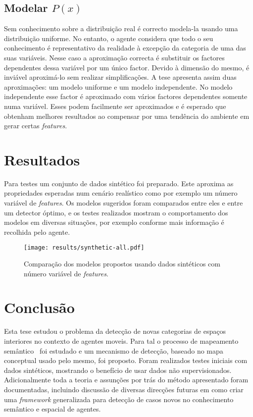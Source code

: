 \documentclass[9pt,a4paper]{extarticle}
\begin{document}
\begin{multicols}{2}
\subsection{Modelar $P(x)$}
Sem conhecimento sobre a distribuição real é correcto modela-la usando uma distribuição
uniforme. No entanto, o agente considera que todo o seu conhecimento é representativo
da realidade à excepção da categoria de uma das suas variáveis. Nesse caso a aproximação correcta é substituir
os factores dependentes dessa variável por um único factor.
Devido à dimensão do mesmo, é inviável aproximá-lo sem realizar simplificações.
A tese apresenta assim duas aproximações: um modelo uniforme e um modelo independente. No modelo independente
esse factor é aproximado com vários factores dependentes somente numa variável. Esses podem facilmente ser
aproximados e é esperado que obtenham melhores resultados ao compensar por uma tendência do ambiente em gerar
certas \emph{features}.

\section{Resultados}
Para testes um conjunto de dados sintético foi preparado. Este aproxima as propriedades
esperadas num cenário realístico como por exemplo um número variável de \emph{features}.
Os modelos sugeridos foram comparados entre eles e entre um detector óptimo, e os testes realizados
mostram o comportamento dos modelos em diversas situações, por exemplo conforme mais informação
é recolhida pelo agente.

\begin{figure}[H]
\centering
\texttt{[image: results/synthetic-all.pdf]}
\caption{\label{fig:results}Comparação dos modelos propostos usando dados sintéticos com número variável de \emph{features}.}
\end{figure}

\section{Conclusão}
Esta tese estudou o problema da detecção de novas categorias de espaços interiores no contexto de agentes moveis.
Para tal o processo de mapeamento semântico~\cite{pronobis2011semmap} foi estudado e um mecanismo de detecção,
baseado no mapa conceptual usado pelo mesmo, foi proposto.
Foram realizados testes iniciais com dados sintéticos, mostrando o benefício de usar dados não supervisionados.
Adicionalmente toda a teoria e assunções por trás do método apresentado foram documentadas, incluindo
discussão de diversas direcções futuras em como criar uma \emph{framework} generalizada para detecção de casos
novos no conhecimento semântico e espacial de agentes.





\end{multicols}
\end{document}
